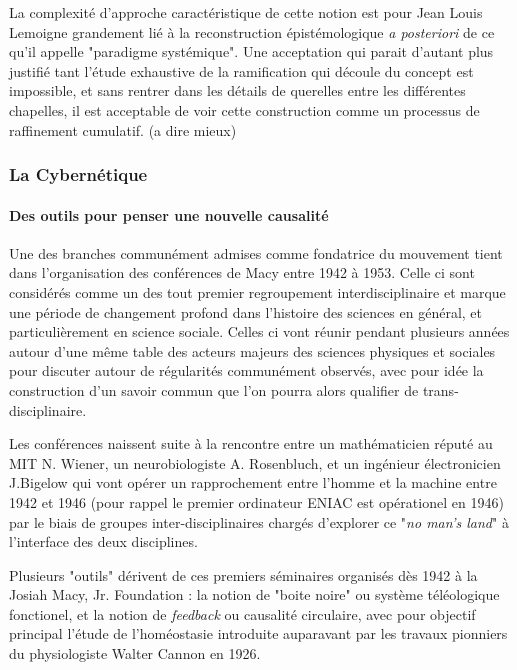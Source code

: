 {La complexité d'approche caractéristique de cette notion est pour Jean Louis Lemoigne grandement lié à la reconstruction épistémologique \textit{a posteriori} de ce qu'il appelle "paradigme systémique". Une acceptation qui parait d'autant plus justifié tant l'étude exhaustive de la ramification qui découle du concept est impossible, et sans rentrer dans les détails de querelles entre les différentes chapelles, il est acceptable de voir cette construction comme un processus de raffinement cumulatif. (a dire mieux)

\subsubsection{La Cybernétique}
\label{ssubsec:cybernetic}

\paragraph{Des outils pour penser une nouvelle causalité}

Une des branches communément admises comme fondatrice du mouvement tient dans l'organisation des conférences de Macy entre 1942 à 1953. Celle ci sont considérés comme un des tout premier regroupement interdisciplinaire et marque une période de changement profond dans l'histoire des sciences en général, et particulièrement en science sociale. Celles ci vont réunir pendant plusieurs années autour d'une même table des acteurs majeurs des sciences physiques et sociales pour discuter autour de régularités communément observés, avec pour idée la construction d'un savoir commun que l'on pourra alors qualifier de trans-disciplinaire. 

Les conférences naissent suite à la rencontre entre un mathématicien réputé au MIT N. Wiener, un neurobiologiste A. Rosenbluch, et un ingénieur électronicien J.Bigelow qui vont opérer un rapprochement entre l'homme et la machine entre 1942 et 1946 (pour rappel le premier ordinateur ENIAC est opérationel en 1946) par le biais de groupes inter-disciplinaires chargés d'explorer ce "\textit{no man's land}" à l'interface des deux disciplines. 

Plusieurs "outils" dérivent de ces premiers séminaires organisés dès 1942 à la Josiah Macy, Jr. Foundation : la notion de "boite noire" ou système téléologique fonctionel, et la notion de \textit{feedback} ou causalité circulaire, avec pour objectif principal l'étude de l'homéostasie introduite auparavant par les travaux pionniers du physiologiste Walter Cannon en 1926.

}
